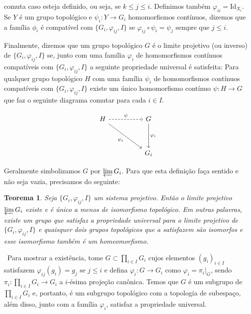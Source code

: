 \documentclass[12pt,a4paper]{article}
\newtheorem{thrm}[mydef]{Teorema}
\def\dem{\par\smallbreak\noindent {\textit{ Demonstração:}} \ }
\theoremstyle{definition}
\begin{document}
comuta caso esteja definido, ou seja, se $k\leq j \leq i$. Definimos também $\varphi_{ii}=\text{Id}_{X_i}$. Se $Y$ é um grupo topológico e $\psi_i: Y \rightarrow G_i$ homomorfismos contínuos, dizemos que a família $\phi_i$ é compatível com $\{G_i, \varphi_{ij} , I\}$ se $\varphi_{ij}\circ \psi_i=\psi_j$ sempre que $j\leq i$. 

Finalmente, dizemos que um grupo topológico $G$ é o limite projetivo (ou inverso) de $\{G_i, \varphi_{ij} , I\}$ se, junto com uma família $\varphi_i$ de homomorfismos contínuos compatíveis com $\{G_i, \varphi_{ij} , I\}$ a seguinte propriedade universal é satisfeita: Para qualquer grupo topológico $H$ com uma família $\psi_i$ de homomorfismos contínuos compatíveis com $\{G_i, \varphi_{ij} , I\}$ existe um único homomorfismo contínuo $\psi: H\rightarrow G$ que faz o seguinte diagrama comutar para cada $i\in I$.

$$\begin{tikzcd}
    H  \arrow[dashrightarrow]{rr}{\psi} \arrow{rrdd}[swap]{\psi_i} & & G \arrow{dd}{\varphi_{i}}\\
    & & \\
    & & G_i  
\end{tikzcd}$$

Geralmente simbolizamos $G$ por $\varprojlim G_i$. Para que esta definição faça sentido e não seja vazia, precisamos do seguinte: 

\begin{thrm}

    Seja $\{G_i, \varphi_{ij} , I\}$ um sistema projetivo. Então o limite projetivo $\varprojlim G_i$ existe e é único a menos de isomorfismo topológico. Em outras palavras, existe um grupo que satisfaz a propriedade universal para o limite projetivo de $\{G_i, \varphi_{ij} , I\}$ e quaisquer dois grupos topológicos que a satisfazem são isomorfos e esse isomorfismo também é um homeomorfismo.

\end{thrm}

\dem Para mostrar a existência, tome $G\subset \prod_{i\in I}G_i$ cujos elementos $(g_i)_{i\in I}$ satisfazem $\varphi_{ij}(g_i)=g_j$ se $j\leq i$ e defina $\varphi_i:G\rightarrow G_i$ como $\varphi_i=\pi_i|_G$, sendo $\pi_i:\prod_{i\in I}G_i\rightarrow G_i$ a $i$-ésima projeção canônica. Temos que $G$ é um subgrupo de $\prod_{i\in I}G_i$ e, portanto, é um subgrupo topológico com a topologia de subespaço, além disso, junto com a família $\varphi_i$, satisfaz a propriedade universal. 
\end{document}
